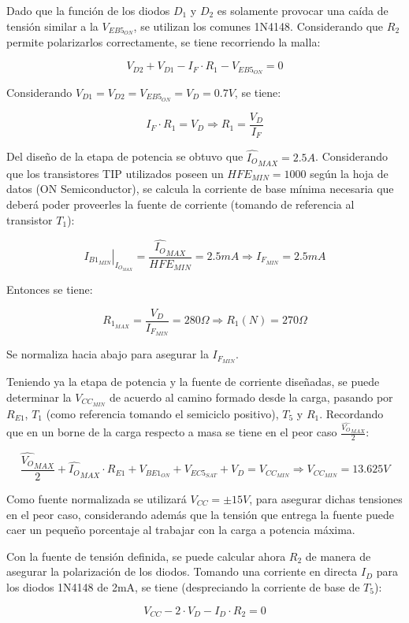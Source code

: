 Dado que la función de los diodos $D_1$ y $D_2$ es solamente provocar una caída de tensión similar a la $V_{EB5_{ON}}$, se utilizan los comunes 1N4148. Considerando que $R_2$ permite polarizarlos correctamente, se tiene recorriendo la malla:

\[
V_{D2} + V_{D1} - I_F \cdot R_1 - V_{EB5_{ON}} = 0
\]

Considerando $V_{D1} = V_{D2} = V_{EB5_{ON}} = V_D = 0.7V$, se tiene:

\[
I_F \cdot R_1 = V_D \Longrightarrow R_1 = \frac{V_D}{I_F}
\]

Del diseño de la etapa de potencia se obtuvo que $\hat{I_O}_{MAX} = 2.5A$. Considerando que los transistores TIP utilizados poseen un $HFE_{MIN} = 1000$ según la hoja de datos (ON Semiconductor), se calcula la corriente de base mínima necesaria que deberá poder proveerles la fuente de corriente (tomando de referencia al transistor $T_1$):

\[
\left. I_{B1_{MIN}} \right|_{I_{O_{MAX}}} = \frac{\hat{I_O}_{MAX}}{HFE_{MIN}} = 2.5mA \Longrightarrow I_{F_{MIN}} = 2.5mA
\]

Entonces se tiene:

\[
R_{1_{MAX}} = \frac{V_D}{I_{F_{MIN}}} = 280\Omega \Longrightarrow R_1(N) = 270\Omega
\]

Se normaliza hacia abajo para asegurar la $I_{F_{MIN}}$.\par
Teniendo ya la etapa de potencia y la fuente de corriente diseñadas, se puede determinar la $V_{CC_{MIN}}$ de acuerdo al camino formado desde la carga, pasando por $R_{E1}$, $T_1$ (como referencia tomando el semiciclo positivo), $T_5$ y $R_1$. Recordando que en un borne de la carga respecto a masa se tiene en el peor caso $\frac{\hat{V_O}_{MAX}}{2}$:

\[
\frac{\hat{V_O}_{MAX}}{2} + \hat{I_O}_{MAX} \cdot R_{E1} + V_{BE1_{ON}} + V_{EC5_{SAT}} + V_D = V_{CC_{MIN}} \Longrightarrow V_{CC_{MIN}} = 13.625V
\]

Como fuente normalizada se utilizará $V_{CC} = \pm 15V$, para asegurar dichas tensiones en el peor caso, considerando además que la tensión que entrega la fuente puede caer un pequeño porcentaje al trabajar con la carga a potencia máxima.\par
Con la fuente de tensión definida, se puede calcular ahora $R_2$ de manera de asegurar la polarización de los diodos. Tomando una corriente en directa $I_D$ para los diodos 1N4148 de 2mA, se tiene (despreciando la corriente de base de $T_5$):

\[
V_{CC} - 2 \cdot V_D - I_D \cdot R_2 = 0
\]

